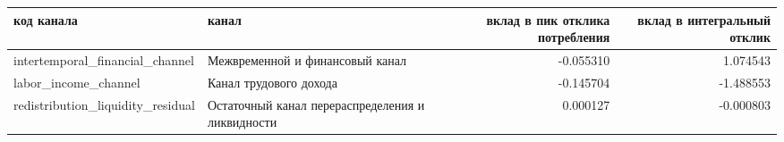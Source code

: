 \begin{tabular}{llrr}
\toprule
код канала & канал & вклад в пик отклика потребления & вклад в интегральный отклик \\
\midrule
intertemporal_financial_channel & Межвременной и финансовый канал & -0.055310 & 1.074543 \\
labor_income_channel & Канал трудового дохода & -0.145704 & -1.488553 \\
redistribution_liquidity_residual & Остаточный канал перераспределения и ликвидности & 0.000127 & -0.000803 \\
\bottomrule
\end{tabular}
